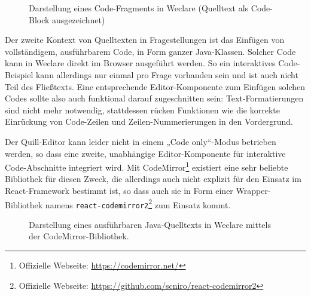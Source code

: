 \begin{figure}[H]
    \centering
    \setlength{\fboxsep}{0pt}
    \setlength{\fboxrule}{0.5pt}
    \caption[Darstellung eines Code-Fragments in Weclare]{Darstellung eines Code-Fragments in Weclare (Quelltext als Code-Block ausgezeichnet)}
    \label{abb:weclare_code_fragment}
\end{figure}

Der zweite Kontext von Quelltexten in Fragestellungen ist das Einfügen von vollständigem, ausführbarem Code, in Form ganzer Java-Klassen. Solcher Code kann in Weclare direkt im Browser ausgeführt werden. So ein interaktives Code-Beispiel kann allerdings nur einmal pro Frage vorhanden sein und ist auch nicht Teil des Fließtexts. Eine entsprechende Editor-Komponente zum Einfügen solchen Codes sollte also auch funktional darauf zugeschnitten sein: Text-Formatierungen sind nicht mehr notwendig, stattdessen rücken Funktionen wie die korrekte Einrückung von Code-Zeilen und Zeilen-Nummerierungen in den Vordergrund.

Der Quill-Editor kann leider nicht in einem „Code only“-Modus betrieben werden, so dass eine zweite, unabhängige Editor-Komponente für interaktive Code-Abschnitte integriert wird. Mit CodeMirror\footnote{Offizielle Webseite: \url{https://codemirror.net/}} existiert eine sehr beliebte Bibliothek für diesen Zweck, die allerdings auch nicht explizit für den Einsatz im React-Framework bestimmt ist, so dass auch sie in Form einer Wrapper-Bibliothek namens \texttt{react-codemirror2}\footnote{Offizielle Webseite: \url{https://github.com/scniro/react-codemirror2}} zum Einsatz kommt.



\begin{figure}[H]
    \centering
    \setlength{\fboxsep}{0pt}
    \setlength{\fboxrule}{0.5pt}
    \caption[Darstellung eines ausführbaren Java-Quelltexts in Weclare]{Darstellung eines ausführbaren Java-Quelltexts in Weclare mittels der CodeMirror-Bibliothek.}
    \label{abb:weclare_codemirror}
\end{figure}